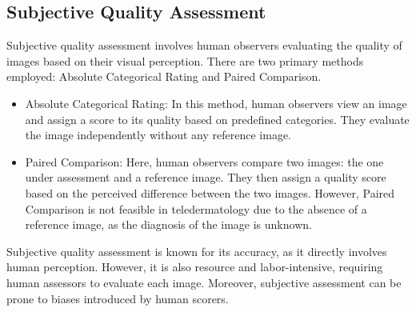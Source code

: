 \subsection{Subjective Quality Assessment}
\label{sub:SubjectiveQualityAssessment}
Subjective quality assessment involves human observers evaluating the quality of images based on their visual perception. There are two primary methods employed: Absolute Categorical Rating and Paired Comparison. \par
\begin{itemize}
    \item Absolute Categorical Rating: In this method, human observers view an image and assign a score to its quality based on predefined categories. They evaluate the image independently without any reference image.
    \item Paired Comparison: Here, human observers compare two images: the one under assessment and a reference image. They then assign a quality score based on the perceived difference between the two images. However, Paired Comparison is not feasible in teledermatology due to the absence of a reference image, as the diagnosis of the image is unknown.
\end{itemize}
Subjective quality assessment is known for its accuracy, as it directly involves human perception. However, it is also resource and labor-intensive, requiring human assessors to evaluate each image. Moreover, subjective assessment can be prone to biases introduced by human scorers. \par

